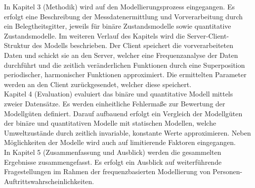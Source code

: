 In Kapitel 3 (Methodik) wird auf den Modellierungsprozess eingegangen. Es erfolgt eine Beschreibung der Messdatenermittlung und Vorverarbeitung durch ein Belegtheitsgitter, jeweils für binäre Zustandsmodelle sowie quantitative Zustandsmodelle. Im weiteren Verlauf des Kapitels wird die Server-Client-Struktur des Modells beschrieben. Der Client speichert die vorverarbeiteten Daten und schickt sie an den Server, welcher eine Frequenzanalyse der Daten durchführt und die zeitlich veränderlichen Funktionen durch eine Superposition periodischer, harmonischer Funktionen approximiert. Die ermittelten Parameter werden an den Client zurückgesendet, welcher diese speichert. \\
Kapitel 4 (Evaluation) evaluiert das binäre und quantitative Modell mittels zweier Datensätze. Es werden einheitliche Fehlermaße zur Bewertung der Modellgüten definiert. Darauf aufbauend erfolgt ein Vergleich der Modellgüten der binäre und quantitativen Modelle mit statischen Modellen, welche Umweltzustände durch zeitlich invariable, konstante Werte approximieren. Neben Möglichkeiten der Modelle wird auch auf limitierende Faktoren eingegangen. \\
In Kapitel 5 (Zusammenfassung und Ausblick) werden die gesammelten Ergebnisse zusammengefasst. Es erfolgt ein Ausblick auf weiterführende Fragestellungen im Rahmen der frequenzbasierten Modellierung von Personen-Auftrittswahrscheinlichkeiten.